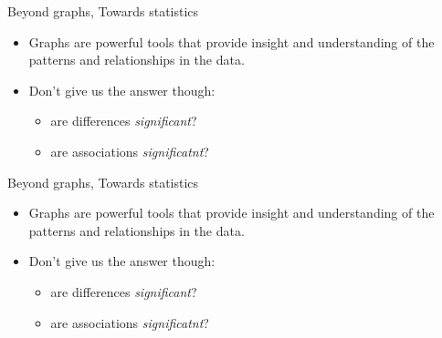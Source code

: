 \documentclass[ignorenonframetext,t]{beamer}
\providecommand{\tightlist}{%
  \setlength{\itemsep}{0pt}\setlength{\parskip}{0pt}}
\begin{document}
\begin{frame}{Beyond graphs, Towards statistics}

\begin{itemize}
\item
  Graphs are powerful tools that provide insight and understanding of
  the patterns and relationships in the data.
\item
  Don't give us the answer though:

  \begin{itemize}
  \tightlist
  \item
    are differences \emph{significant}?
  \item
    are associations \emph{significatnt}?
  \end{itemize}
\end{itemize}


\end{frame}

\begin{frame}{Beyond graphs, Towards statistics}

\begin{itemize}
\item
  Graphs are powerful tools that provide insight and understanding of
  the patterns and relationships in the data.
\item
  Don't give us the answer though:

  \begin{itemize}
  \tightlist
  \item
    are differences \emph{significant}?
  \item
    are associations \emph{significatnt}?
  \end{itemize}
\end{itemize}


\end{frame}
\end{document}
